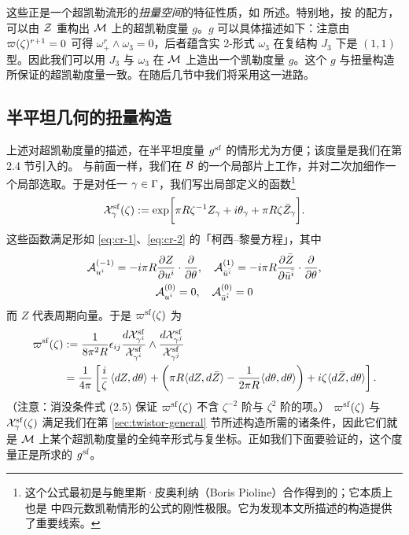 这些正是一个超凯勒流形的\emph{扭量空间}的特征性质，如 \cite{Hitchin:1986ea,MR1206066} 所述。特别地，按 \cite{Hitchin:1986ea,MR1206066} 的配方，可以由 $\mathcal{Z}$ 重构出 $\mathcal{M}$ 上的超凯勒度量 $g$。$g$ 可以具体描述如下：注意由 $\varpi(\zeta)^{r+1} = 0$ 可得 $\omega_+^r \wedge \omega_3 = 0$，后者蕴含实 2-形式 $\omega_3$ 在复结构 $J_3$ 下是 $(1,1)$ 型。因此我们可以用 $J_3$ 与 $\omega_3$ 在 $\mathcal{M}$ 上造出一个凯勒度量 $g$。这个 $g$ 与扭量构造所保证的超凯勒度量一致。在随后几节中我们将采用这一进路。

\subsection{半平坦几何的扭量构造}
\label{sec:semiflat-twistor}

上述对超凯勒度量的描述，在半平坦度量 $g^{\mathrm{sf}}$ 的情形尤为方便；该度量是我们在第 2.4 节引入的。%
与前面一样，我们在 $\mathcal{B}$ 的一个局部片上工作，并对二次加细作一个局部选取。于是对任一 $\gamma \in \Gamma$，我们写出局部定义的函数\footnote{这个公式最初是与鲍里斯·皮奥利纳（Boris Pioline）合作得到的；它本质上也是 \cite{Neitzke:2007ke} 中四元数凯勒情形的公式的刚性极限。它为发现本文所描述的构造提供了重要线索。}
\begin{equation} \label{eq:X-sf}
\mathcal{X}_\gamma^{\mathrm{sf}}(\zeta) := \exp\biggl[ \pi  R \zeta^{-1}  Z_\gamma + i
\theta_\gamma + \pi R \zeta \bar Z_\gamma \biggr].
\end{equation}
这些函数满足形如 \eqref{eq:cr-1}、\eqref{eq:cr-2} 的「柯西--黎曼方程」，其中
\begin{gather}
\mathcal{A}^{(-1)}_{u^i} = -i \pi R \frac{\partial Z}{\partial u^i} \cdot \frac{\partial}{\partial \theta}, \quad \mathcal{A}^{(1)}_{\bar{u}^{\bar{i}}} = -i \pi R \frac{\partial \bar{Z}}{\partial \bar{u}^{\bar{i}}} \cdot \frac{\partial}{\partial \theta}, \\
\mathcal{A}^{(0)}_{u^i} = 0, \quad \mathcal{A}^{(0)}_{\bar{u}^{\bar{i}}} = 0
\end{gather}
而 $Z$ 代表周期向量。于是 $\varpi^{\mathrm{sf}}(\zeta)$ 为
\begin{align} \label{eq:Omega-sf}
\varpi^{\mathrm{sf}}(\zeta) & := \frac{1}{8 \pi^2 R} \epsilon_{ij} \frac{d \mathcal{X}^{\mathrm{sf}}_{\gamma^i}}{\mathcal{X}^{\mathrm{sf}}_{\gamma^i}} \wedge \frac{d \mathcal{X}^{\mathrm{sf}}_{\gamma^j}}{\mathcal{X}^{\mathrm{sf}}_{\gamma^j}} \\
&= \frac{1}{4\pi} \left[ \frac{i}{\zeta} \left\langle d Z, d \theta \right\rangle + \left( \pi R \langle d Z, d \bar{Z} \rangle - \frac{1}{2 \pi R} \langle d \theta , d \theta \rangle \right) + i \zeta \langle d \bar{Z}, d \theta \rangle \right]. \label{eq:Omega-sf-2}
\end{align}
（注意：消没条件式 (2.5) 保证 $\varpi^{\mathrm{sf}}(\zeta)$ 不含 $\zeta^{-2}$ 阶与 $\zeta^2$ 阶的项。）%
$\varpi^{\mathrm{sf}}(\zeta)$ 与 $\mathcal{X}^{\mathrm{sf}}_\gamma(\zeta)$ 满足我们在第 \ref{sec:twistor-general} 节所述构造所需的诸条件，因此它们就是 $\mathcal{M}$ 上某个超凯勒度量的全纯辛形式与复坐标。正如我们下面要验证的，这个度量正是所求的 $g^{\mathrm{sf}}$。

